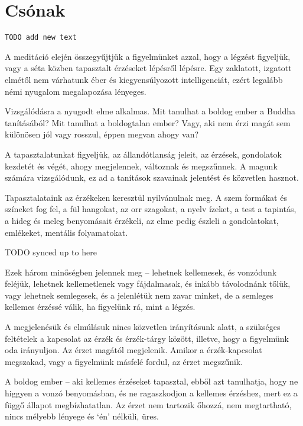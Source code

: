 \chapter{Csónak}

\begin{verbatim}
TODO add new text
\end{verbatim}


A meditáció elején összegyűjtjük a figyelmünket azzal, hogy a légzést
figyeljük, vagy a séta közben tapasztalt érzéseket lépésről lépésre. Egy
zaklatott, izgatott elmétől nem várhatunk éber és kiegyensúlyozott
intelligenciát, ezért legalább némi nyugalom megalapozása lényeges.

Vizsgálódásra a nyugodt elme alkalmas. Mit tanulhat a boldog ember a
Buddha tanításából? Mit tanulhat a boldogtalan ember? Vagy, aki nem érzi
magát sem különösen jól vagy rosszul, éppen megvan ahogy van?

A tapasztalatunkat figyeljük, az állandótlanság jeleit, az érzések,
gondolatok kezdetét és végét, ahogy megjelennek, változnak és
megszűnnek. A magunk számára vizsgálódunk, ez ad a tanítások szavainak
jelentést és közvetlen hasznot.

Tapasztalataink az érzékeken keresztül nyilvánulnak meg. A szem formákat
és színeket fog fel, a fül hangokat, az orr szagokat, a nyelv ízeket, a
test a tapintás, a hideg és meleg benyomásait érzékeli, az elme pedig
észleli a gondolatokat, emlékeket, mentális folyamatokat.


TODO synced up to here

Ezek három minőségben jelennek meg -- lehetnek kellemesek, és vonzódunk
feléjük, lehetnek kellemetlenek vagy fájdalmasak, és inkább távolodnánk
tőlük, vagy lehetnek semlegesek, és a jelenlétük nem zavar minket, de a
semleges kellemes érzéssé válik, ha figyelünk rá, mint a légzés.

A megjelenésük és elmúlásuk nincs közvetlen irányításunk alatt, a
szükséges feltételek a kapcsolat az érzék és érzék-tárgy között,
illetve, hogy a figyelmünk oda irányuljon. Az érzet magától megjelenik.
Amikor a érzék-kapcsolat megszakad, vagy a figyelmünk másfelé fordul, az
érzet megszűnik.

A boldog ember -- aki kellemes érzéseket tapasztal, ebből azt
tanulhatja, hogy ne higgyen a vonzó benyomásban, és ne ragaszkodjon a
kellemes érzéshez, mert ez a függő állapot megbízhatatlan. Az érzet nem
tartozik őhozzá, nem megtartható, nincs mélyebb lényege és `én' nélküli,
üres.

